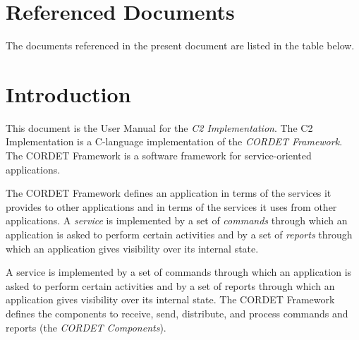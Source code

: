 \documentclass{pnp_article}
\begin{document}
\maketitle

\newcommand{\chgC}[1]{{\color{red}{#1}}{}} 		%

\tableofcontents
\listoffigures
\listoftables

\section{Referenced Documents}

The documents referenced in the present document are listed in the table below.

\listofreferencedocs{\CrUm}


\newpage
\section{Introduction}
This document is the User Manual for the \textit{C2 Implementation}. 
The C2 Implementation is a C-language implementation of the \textit{CORDET Framework}.
The CORDET Framework is a software framework for service-oriented applications. 

The CORDET Framework defines an application in terms of the services it provides to other applications and in terms of the services it uses from other applications.
A \textit{service} is implemented by a set of \textit{commands} through which an application is asked to perform certain activities and by a set of \textit{reports} through which an application gives visibility over its internal state.

A service is implemented by a set of commands through which an application is asked to perform certain activities and by a set of reports through which an application gives visibility over its internal state. The CORDET Framework defines the components to receive, send, distribute, and process commands and reports (the \textit{CORDET Components}).
\end{document}
